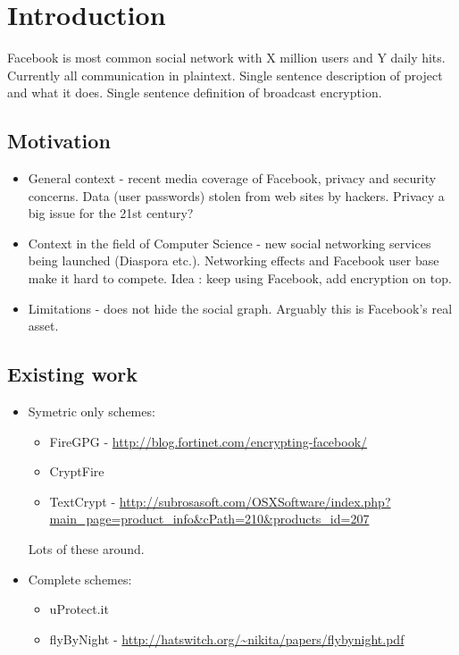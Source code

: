 \chapter{Introduction}\label{ch:introduction}

Facebook is most common social network with X million users and Y daily hits. Currently all communication in plaintext. Single sentence description of project and what it does. Single sentence definition of broadcast encryption.

\section{Motivation}

\begin{itemize}

    \item General context - recent media coverage of Facebook, privacy and security concerns. Data (user passwords) stolen from web sites by hackers. Privacy a big issue for the 21st century?
    
    \item Context in the field of Computer Science - new social networking services being launched (Diaspora etc.). Networking effects and Facebook user base make it hard to compete. Idea : keep using Facebook, add encryption on top.
    
    \item Limitations - \cite{aksin} does not hide the social graph. Arguably this is Facebook's real asset.

\end{itemize}


\section{Existing work}
\begin{itemize}
    \item Symetric only schemes:
    
    \begin{itemize}
        \item FireGPG - \url{http://blog.fortinet.com/encrypting-facebook/}
        \item CryptFire
        \item TextCrypt - \url{http://subrosasoft.com/OSXSoftware/index.php?main_page=product_info&cPath=210&products_id=207}
    \end{itemize}
    
    Lots of these around.
    
    \item Complete schemes:
    
    \begin{itemize}
        \item uProtect.it
        \item flyByNight - \url{http://hatswitch.org/~nikita/papers/flybynight.pdf}
    \end{itemize}
\end{itemize}




